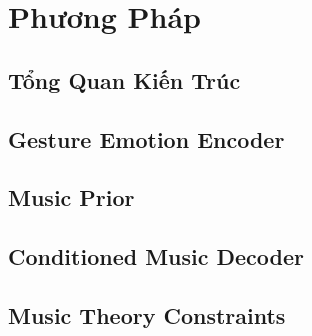﻿\chapter{Phương Pháp}
\label{chap:method}
\section{Tổng Quan Kiến Trúc}
\section{Gesture Emotion Encoder}
\section{Music Prior}
\section{Conditioned Music Decoder}
\section{Music Theory Constraints}
